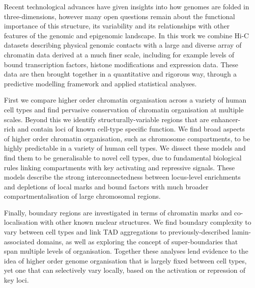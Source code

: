 Recent technological advances have given insights into how genomes are folded in three-dimensions, however many open questions remain about the functional importance of this structure, its variability and its relationships with other features of the genomic and epigenomic landscape. In this work we combine Hi-C datasets describing physical genomic contacts with a large and diverse array of chromatin data derived at a much finer scale, including for example levels of bound transcription factors, histone modifications and expression data. These data are then brought together in a quantitative and rigorous way, through a predictive modelling framework and applied statistical analyses.

First we compare higher order chromatin organisation across a variety of human cell types and find pervasive conservation of chromatin organisation at multiple scales. Beyond this we identify structurally-variable regions that are enhancer-rich and contain loci of known cell-type specific function. We find broad aspects of higher order chromatin organisation, such as chromosome compartments, to be highly predictable in a variety of human cell types. We dissect these models and find them to be generalisable to novel cell types, due to fundamental biological rules linking compartments with key activating and repressive signals. These models describe the strong interconnectedness between locus-level enrichments and depletions of local marks and bound factors with much broader compartmentalisation of large chromosomal regions.

Finally, boundary regions are investigated in terms of chromatin marks and co-localisation with other known nuclear structures. We find boundary complexity to vary between cell types and link TAD aggregations to previously-described lamin-associated domains, as well as exploring the concept of super-boundaries that span multiple levels of organisation. Together these analyses lend evidence to the idea of higher order genome organisation that is largely fixed between cell types, yet one that can selectively vary locally, based on the activation or repression of key loci. 